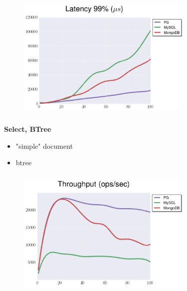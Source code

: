 \documentclass[usenames,dvipsnames, 18pt, compress, aspectratio=169]{beamer}
\begin{document}
\begin{frame}
    \frametitle{}
    \begin{center}
    \begin{figure}
        \includegraphics[width=0.75\textwidth,center]{benchmarks/select_jsonb_path_ops_latency_99.png}
    \end{figure}
    \end{center}
\end{frame}

\begin{frame}
    \frametitle{}
    \begin{center}
        \textbf{Select, BTree }
        \begin{itemize}[label={}]
            \item "simple" document
            \item btree
        \end{itemize}
    \end{center}
\end{frame}

\begin{frame}
    \frametitle{}
    \begin{center}
    \begin{figure}
        \includegraphics[width=0.75\textwidth,center]{benchmarks/select_btree_throughput.png}
    \end{figure}
    \end{center}
\end{frame}
\end{document}
